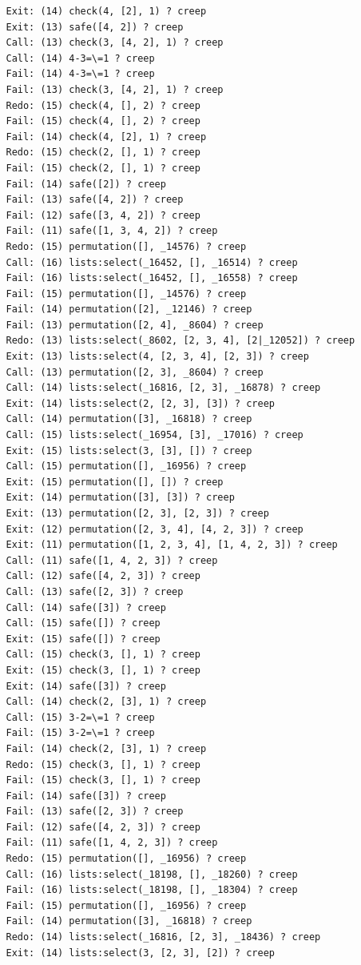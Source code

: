\documentclass{article}
\begin{document}
\begin{verbatim}
   Exit: (14) check(4, [2], 1) ? creep
   Exit: (13) safe([4, 2]) ? creep
   Call: (13) check(3, [4, 2], 1) ? creep
   Call: (14) 4-3=\=1 ? creep
   Fail: (14) 4-3=\=1 ? creep
   Fail: (13) check(3, [4, 2], 1) ? creep
   Redo: (15) check(4, [], 2) ? creep
   Fail: (15) check(4, [], 2) ? creep
   Fail: (14) check(4, [2], 1) ? creep
   Redo: (15) check(2, [], 1) ? creep
   Fail: (15) check(2, [], 1) ? creep
   Fail: (14) safe([2]) ? creep
   Fail: (13) safe([4, 2]) ? creep
   Fail: (12) safe([3, 4, 2]) ? creep
   Fail: (11) safe([1, 3, 4, 2]) ? creep
   Redo: (15) permutation([], _14576) ? creep
   Call: (16) lists:select(_16452, [], _16514) ? creep
   Fail: (16) lists:select(_16452, [], _16558) ? creep
   Fail: (15) permutation([], _14576) ? creep
   Fail: (14) permutation([2], _12146) ? creep
   Fail: (13) permutation([2, 4], _8604) ? creep
   Redo: (13) lists:select(_8602, [2, 3, 4], [2|_12052]) ? creep
   Exit: (13) lists:select(4, [2, 3, 4], [2, 3]) ? creep
   Call: (13) permutation([2, 3], _8604) ? creep
   Call: (14) lists:select(_16816, [2, 3], _16878) ? creep
   Exit: (14) lists:select(2, [2, 3], [3]) ? creep
   Call: (14) permutation([3], _16818) ? creep
   Call: (15) lists:select(_16954, [3], _17016) ? creep
   Exit: (15) lists:select(3, [3], []) ? creep
   Call: (15) permutation([], _16956) ? creep
   Exit: (15) permutation([], []) ? creep
   Exit: (14) permutation([3], [3]) ? creep
   Exit: (13) permutation([2, 3], [2, 3]) ? creep
   Exit: (12) permutation([2, 3, 4], [4, 2, 3]) ? creep
   Exit: (11) permutation([1, 2, 3, 4], [1, 4, 2, 3]) ? creep
   Call: (11) safe([1, 4, 2, 3]) ? creep
   Call: (12) safe([4, 2, 3]) ? creep
   Call: (13) safe([2, 3]) ? creep
   Call: (14) safe([3]) ? creep
   Call: (15) safe([]) ? creep
   Exit: (15) safe([]) ? creep
   Call: (15) check(3, [], 1) ? creep
   Exit: (15) check(3, [], 1) ? creep
   Exit: (14) safe([3]) ? creep
   Call: (14) check(2, [3], 1) ? creep
   Call: (15) 3-2=\=1 ? creep
   Fail: (15) 3-2=\=1 ? creep
   Fail: (14) check(2, [3], 1) ? creep
   Redo: (15) check(3, [], 1) ? creep
   Fail: (15) check(3, [], 1) ? creep
   Fail: (14) safe([3]) ? creep
   Fail: (13) safe([2, 3]) ? creep
   Fail: (12) safe([4, 2, 3]) ? creep
   Fail: (11) safe([1, 4, 2, 3]) ? creep
   Redo: (15) permutation([], _16956) ? creep
   Call: (16) lists:select(_18198, [], _18260) ? creep
   Fail: (16) lists:select(_18198, [], _18304) ? creep
   Fail: (15) permutation([], _16956) ? creep
   Fail: (14) permutation([3], _16818) ? creep
   Redo: (14) lists:select(_16816, [2, 3], _18436) ? creep
   Exit: (14) lists:select(3, [2, 3], [2]) ? creep

\end{verbatim}
\end{document}
